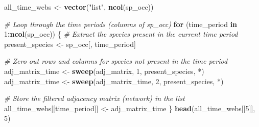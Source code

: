 \documentclass[
]{article}
\newenvironment{Shaded}{\begin{snugshade}}{\end{snugshade}}
\newcommand{\AttributeTok}[1]{\textcolor[rgb]{0.13,0.29,0.53}{#1}}
\newcommand{\CommentTok}[1]{\textcolor[rgb]{0.56,0.35,0.01}{\textit{#1}}}
\newcommand{\ControlFlowTok}[1]{\textcolor[rgb]{0.13,0.29,0.53}{\textbf{#1}}}
\newcommand{\DecValTok}[1]{\textcolor[rgb]{0.00,0.00,0.81}{#1}}
\newcommand{\FunctionTok}[1]{\textcolor[rgb]{0.13,0.29,0.53}{\textbf{#1}}}
\newcommand{\NormalTok}[1]{#1}
\newcommand{\OtherTok}[1]{\textcolor[rgb]{0.56,0.35,0.01}{#1}}
\newcommand{\SpecialCharTok}[1]{\textcolor[rgb]{0.81,0.36,0.00}{\textbf{#1}}}
\newcommand{\StringTok}[1]{\textcolor[rgb]{0.31,0.60,0.02}{#1}}
\begin{document}
\begin{Shaded}
\begin{Highlighting}[]
\NormalTok{all\_time\_webs }\OtherTok{\textless{}{-}} \FunctionTok{vector}\NormalTok{(}\StringTok{"list"}\NormalTok{, }\FunctionTok{ncol}\NormalTok{(sp\_occ))}

\CommentTok{\# Loop through the time periods (columns of sp\_occ)}
\ControlFlowTok{for}\NormalTok{ (time\_period }\ControlFlowTok{in} \DecValTok{1}\SpecialCharTok{:}\FunctionTok{ncol}\NormalTok{(sp\_occ)) \{}
  \CommentTok{\# Extract the species present in the current time period}
\NormalTok{  present\_species }\OtherTok{\textless{}{-}}\NormalTok{ sp\_occ[, time\_period]}
  
  \CommentTok{\# Zero out rows and columns for species not present in the time period}
\NormalTok{  adj\_matrix\_time }\OtherTok{\textless{}{-}} \FunctionTok{sweep}\NormalTok{(adj\_matrix, }\DecValTok{1}\NormalTok{, present\_species, }\StringTok{\textasciigrave{}}\AttributeTok{*}\StringTok{\textasciigrave{}}\NormalTok{)}
\NormalTok{  adj\_matrix\_time }\OtherTok{\textless{}{-}} \FunctionTok{sweep}\NormalTok{(adj\_matrix\_time, }\DecValTok{2}\NormalTok{, present\_species, }\StringTok{\textasciigrave{}}\AttributeTok{*}\StringTok{\textasciigrave{}}\NormalTok{)}
  
  \CommentTok{\# Store the filtered adjacency matrix (network) in the list}
\NormalTok{  all\_time\_webs[[time\_period]] }\OtherTok{\textless{}{-}}\NormalTok{ adj\_matrix\_time}
\NormalTok{\}}
\FunctionTok{head}\NormalTok{(all\_time\_webs[[}\DecValTok{5}\NormalTok{]], }\DecValTok{5}\NormalTok{)}
\end{Highlighting}
\end{Shaded}
\end{document}
